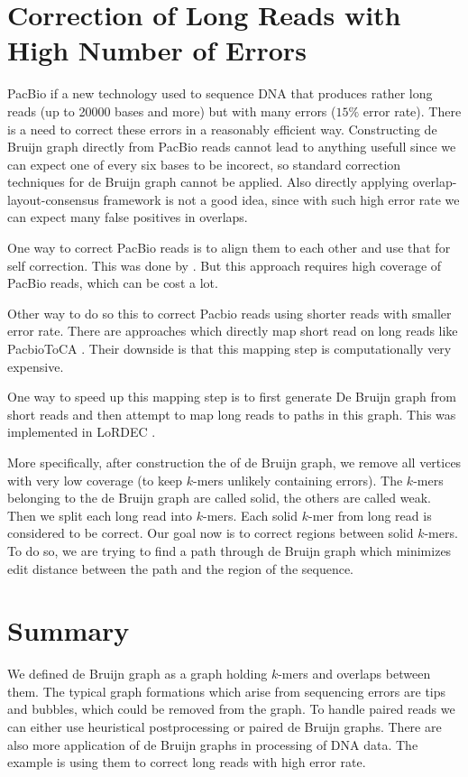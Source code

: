 \section{Correction of Long Reads with High Number of Errors}

PacBio if a new technology used to sequence DNA that produces
rather long reads (up to 20000 bases and more) but with many errors
($15\%$ error rate). There is a need to correct these errors in a reasonably
efficient way. Constructing de Bruijn graph directly from PacBio reads
cannot lead to anything usefull since we can expect one of every six bases to be
incorect, so standard correction techniques for de Bruijn graph cannot be applied.
Also directly applying overlap-layout-consensus framework is not a good idea, since
with such high error rate we can expect many false positives in overlaps.

One way to correct PacBio reads is to align them to each other and use that for self correction.
This was done by \citet{MHAP}. But this approach requires high coverage
of PacBio reads, which can be cost a lot.

Other way to do so this to correct Pacbio reads using shorter reads with smaller
error rate. There are approaches which directly map short read on long reads like
PacbioToCA \citep{PacbioToCA}. Their downside is that this mapping step
is computationally very expensive.

One way to speed up this mapping step is to first generate De Bruijn graph from short reads
and then attempt to map long reads to paths in this graph. This was implemented
in LoRDEC \citep{Lordec}.

More specifically, after construction the of de Bruijn graph, we remove all vertices
with very low coverage (to keep $k$-mers unlikely containing errors). The $k$-mers belonging
to the de Bruijn graph are called solid, the others are called weak.
Then we split each long read into $k$-mers.
Each solid $k$-mer from long read is considered to be correct. 
Our goal now is to correct regions between solid $k$-mers. To do so, we are trying
to find a path through de Bruijn graph which minimizes edit distance between the path
and the region of the sequence.

\section{Summary}

We defined de Bruijn graph as a graph holding $k$-mers and overlaps between
them. The typical graph formations which arise from sequencing errors are
tips and bubbles, which could be removed from the graph. To handle paired reads
we can either use heuristical postprocessing or paired de Bruijn graphs. 
There are also more application of de Bruijn graphs in processing of DNA data.
The example is using them to correct long reads with high error rate.
